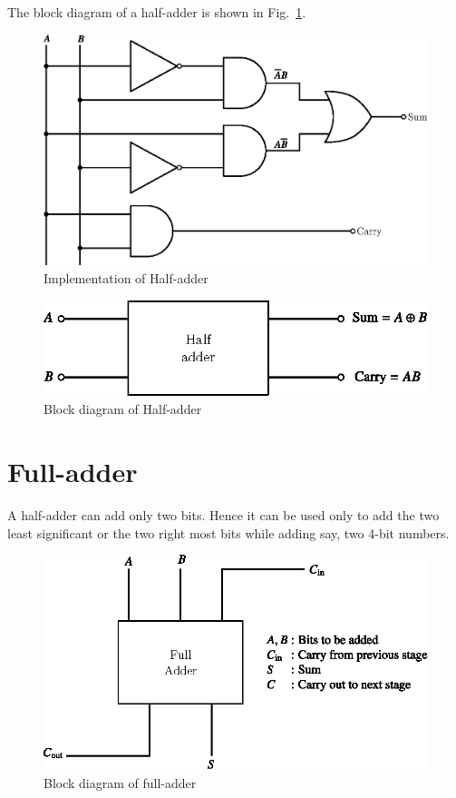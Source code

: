 \noindent
\eject
The block diagram of a half-adder is shown in Fig.~\ref{fig6.28}.
\begin{figure}[H]
\centering
\includegraphics{chap6/fig127_6.28.eps}
\caption{Implementation of Half-adder}\label{fig6.28}
\end{figure}
\begin{figure}[H]
\centering
\includegraphics{chap6/fig128_6.29.eps}
\caption{Block diagram of Half-adder}\label{fig6.29}
\end{figure}

\section{Full-adder}\label{sec6.31}

A half-adder can add only two bits. Hence it can be used only to add the two least significant or the two right most bits while adding say, two 4-bit numbers.
\begin{figure}[H]
\centering
\includegraphics{chap6/fig129_6.30.eps}
\caption{Block diagram of full-adder}\label{fig6.30}
\end{figure}

